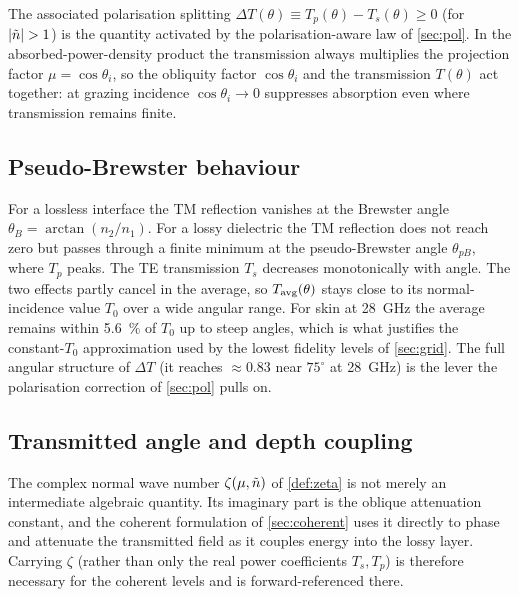 \noindent
The associated polarisation splitting $\Delta T(\theta)\equiv T_p(\theta)-T_s(\theta)\ge0$
(for $\abs{\tilde{n}}>1$) is the quantity activated by the polarisation-aware law
of \cref{sec:pol}. In the absorbed-power-density product the transmission always
multiplies the projection factor $\mu=\cos\theta_i$, so the obliquity factor
$\cos\theta_i$ and the transmission $T(\theta)$ act together: at grazing
incidence $\cos\theta_i\to0$ suppresses absorption even where transmission
remains finite.

\subsection{Pseudo-Brewster behaviour}\label{sec:brewster}

For a lossless interface the TM reflection vanishes at the Brewster angle
$\theta_B=\arctan(n_2/n_1)$. For a lossy dielectric the TM reflection does not
reach zero but passes through a finite minimum at the pseudo-Brewster angle
$\theta_{pB}$, where $T_p$ peaks. The TE transmission $T_s$ decreases
monotonically with angle. The two effects partly cancel in the average, so
$T_{\mathrm{avg}}(\theta)$ stays close to its normal-incidence value $T_0$ over a wide
angular range. For skin at \SI{28}{\giga\hertz} the average remains within
\SI{5.6}{\percent} of $T_0$ up to steep angles, which is what justifies the
constant-$T_0$ approximation used by the lowest fidelity levels of
\cref{sec:grid}. The full angular structure of $\Delta T$ (it reaches
$\approx0.83$ near $75^\circ$ at \SI{28}{\giga\hertz}) is the lever the
polarisation correction of \cref{sec:pol} pulls on.

\subsection{Transmitted angle and depth coupling}\label{sec:zeta-coherent}

The complex normal wave number $\zeta(\mu,\tilde{n})$ of \cref{def:zeta} is not
merely an intermediate algebraic quantity. Its imaginary part is the oblique
attenuation constant, and the coherent formulation of \cref{sec:coherent} uses
it directly to phase and attenuate the transmitted field as it couples energy
into the lossy layer. Carrying $\zeta$ (rather than only the real power
coefficients $T_s,T_p$) is therefore necessary for the coherent levels and is
forward-referenced there.
